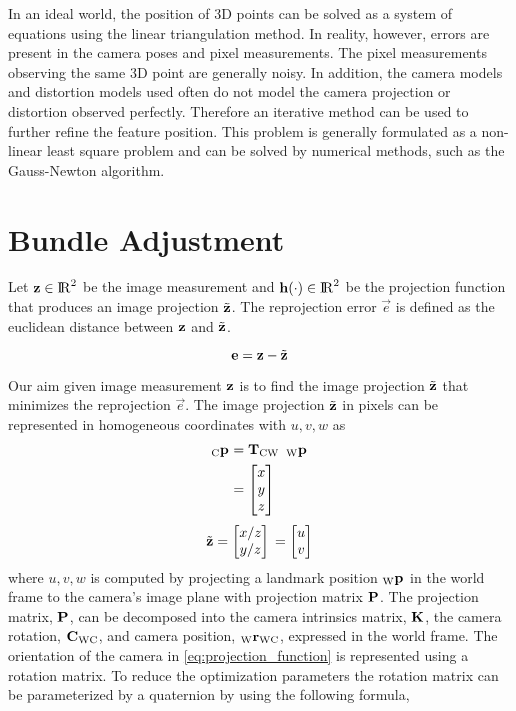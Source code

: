 In an ideal world, the position of 3D points can be solved as a system of
equations using the linear triangulation method. In reality, however, errors
are present in the camera poses and pixel measurements. The pixel measurements
observing the same 3D point are generally noisy. In addition, the camera models
and distortion models used often do not model the camera projection or
distortion observed perfectly. Therefore an iterative method can be used to
further refine the feature position. This problem is generally formulated as a
non-linear least square problem and can be solved by numerical methods, such as
the Gauss-Newton algorithm.



\section{Bundle Adjustment}

Let ${{\mathbf{z}}} \in {\rm I\!R}^{2}$ be the image measurement and ${{\mathbf{h}}}(\cdot)
\in {\rm I\!R}^{2}$ be the projection function that produces an image projection
${\tilde{{\mathbf{z}}}}$. The reprojection error $\Vec{e}$ is defined as the euclidean
distance between ${{\mathbf{z}}}$ and ${\tilde{{\mathbf{z}}}}$.

\begin{equation}
  {{\mathbf{e}}} = {{\mathbf{z}}} - {\tilde{{\mathbf{z}}}}
\end{equation}

Our aim given image measurement ${{\mathbf{z}}}$ is to find the image projection
${\tilde{{\mathbf{z}}}}$ that minimizes the reprojection $\Vec{e}$. The image projection
${\tilde{{\mathbf{z}}}}$ in pixels can be represented in homogeneous coordinates with $u, v,
w$ as
%
\begin{align}
  {{{{}_{{\text{C}}}} {{\mathbf{p}}}_{}}} &= {{{{{\mathbf{T}}}}_{{\text{C}}{\text{W}}}}} \enspace {{{{}_{{\text{W}}}} {{\mathbf{p}}}_{}}} \\
  &= \begin{bmatrix} x \\ y \\ z \end{bmatrix}
\end{align}
%
\begin{equation}
  \label{eq:projection_function}
  {\tilde{{\mathbf{z}}}}
  = \begin{bmatrix} x / z \\ y / z \end{bmatrix} \\
  = \begin{bmatrix} u \\ v \end{bmatrix}
\end{equation}
%
where $u, v, w$ is computed by projecting a landmark position ${{{{}_{{\text{W}}}} {{\mathbf{p}}}_{}}}$ in
the world frame to the camera's image plane with projection matrix ${\mathbf{P}}$.
The projection matrix, ${\mathbf{P}}$, can be decomposed into the camera intrinsics
matrix, ${\mathbf{K}}$, the camera rotation, ${{{{{{\mathbf{C}}}}_{{\text{W}}{\text{C}}}}}}$, and camera position,
${{{{{}_{{\text{W}}}} {{{\mathbf{r}}}}_{{\text{W}}{\text{C}}}}}}$, expressed in the world frame.
%
The orientation of the camera in \eqref{eq:projection_function} is
represented using a rotation matrix. To reduce the optimization parameters
the rotation matrix can be parameterized by a quaternion by using the following
formula,

